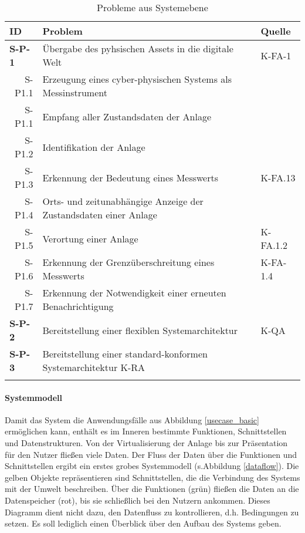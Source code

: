 \begin{table}[ht!]
  \begin{tabularx}{\textwidth}{@{}lXp{2cm}@{}}
      \toprule
      ID                & Problem & Quelle \\
      \midrule
      \textbf{S-P-1}              &       Übergabe des pyhsischen Assets in die digitale Welt               &  K-FA-1               \\
      \multicolumn{1}{r}{S-P1.1} &  Erzeugung eines cyber-physischen Systems als Messinstrument  & \\
      \multicolumn{1}{r}{S-P1.1} &  Empfang aller Zustandsdaten der Anlage     \\
      \multicolumn{1}{r}{S-P1.2} &  Identifikation der Anlage     \\
      \multicolumn{1}{r}{S-P1.3} &  Erkennung der Bedeutung eines Messwerts  & K-FA.13\\
      \multicolumn{1}{r}{S-P1.4} &  Orts- und zeitunabhängige Anzeige der Zustandsdaten einer Anlage     \\
      \multicolumn{1}{r}{S-P1.5} &  Verortung einer Anlage & K-FA.1.2\\
      \multicolumn{1}{r}{S-P1.6} &  Erkennung der Grenzüberschreitung eines Messwerts & K-FA-1.4\\
      \multicolumn{1}{r}{S-P1.7} &  Erkennung der Notwendigkeit einer erneuten Benachrichtigung\\
      \textbf{S-P-2}              &  Bereitstellung einer flexiblen Systemarchitektur  & K-QA \\
      \textbf{S-P-3}              &  Bereitstellung einer standard-konformen Systemarchitektur K-RA \\
      \addlinespace
      \bottomrule
  \end{tabularx}
  \label{system_probleme}
  \caption{Probleme aus Systemebene}

\end{table}


\paragraph{Systemmodell}

Damit das System die Anwendungsfälle aus Abbildung \ref{usecase_basic} ermöglichen kann, enthält es im Inneren bestimmte Funktionen, Schnittstellen und Datenstrukturen. Von der Virtualisierung der Anlage bis zur Präsentation für den Nutzer fließen viele Daten. Der Fluss der Daten über die Funktionen und Schnittstellen ergibt ein erstes grobes Systemmodell (s.Abbildung \ref{dataflow}). Die gelben Objekte repräsentieren sind Schnittstellen, die die Verbindung des Systems mit der Umwelt beschreiben. Über die Funktionen (grün) fließen die Daten an die Datenspeicher (rot), bis sie schließlich bei den Nutzern ankommen. Dieses Diagramm dient nicht dazu, den Datenfluss zu kontrollieren, d.h. Bedingungen zu setzen. Es soll lediglich einen Überblick über den Aufbau des Systems geben.

